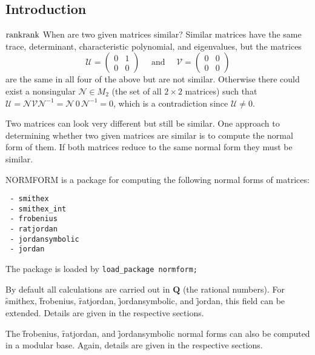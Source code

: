 
\newcommand{\rank}{\mathop{\mathrm{rank}}}

\subsection{Introduction}
\ifdefined\HCode
\(
\def\rank{\mathop{\mathrm{rank}}}
\def\f#1{\texttt{#1}}
\)%
\fi
When are two given matrices similar? Similar matrices have the same
trace, determinant, characteristic polynomial,
and eigenvalues, but the matrices
\[
 \mathcal{U} = \begin{pmatrix} 0 & 1 \\ 0 & 0 \end{pmatrix}
  \quad\text{ and } \quad
 \mathcal{V} = \begin{pmatrix} 0 & 0 \\ 0 & 0 \end{pmatrix}
\]
are the same in all four of the above but are not similar. Otherwise
there could exist a nonsingular $\mathcal{ N} {\in} M_{2}$ (the set of
all $2 \times 2$ matrices) such that $\mathcal{U} = \mathcal{N} \mathcal{V}
\mathcal{N}^{-1} = \mathcal{N} \, \mathit{0} \, \mathcal{N}^{-1} = \mathit{0}$,
which is a contradiction since $\mathcal{U} \neq \mathit{0}$.

Two matrices can look very different but still be similar. One
approach to determining whether two given matrices are similar is to
compute the normal form of them. If both matrices reduce to the same
normal form they must be similar.

{\small NORMFORM} is a package for computing the following normal
forms of matrices:

\begin{verbatim}
 - smithex
 - smithex_int
 - frobenius
 - ratjordan
 - jordansymbolic
 - jordan
\end{verbatim}

The package is loaded by \texttt{load\_package normform;}

By default all calculations are carried out in $\mathbf{Q}$ (the rational
numbers). For \f{smithex}, \f{frobenius}, \f{ratjordan},
\f{jordansymbolic}, and \f{jordan}, this field can be extended.
Details are given in the respective sections.

The \f{frobenius}, \f{ratjordan}, and \f{jordansymbolic} normal
forms can also be computed in a modular base. Again, details are given
in the respective sections.

